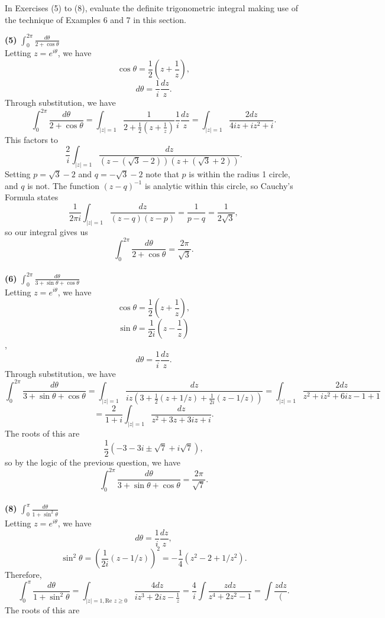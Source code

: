 \documentclass[12pt,letterpaper]{article}
\begin{document}
In Exercises (5) to (8), evaluate the definite trigonometric integral making use of the technique of Examples 6 and 7 in this section.

\textbf{(5)} \(\int_{0}^{2\pi} \frac{d\theta}{2+\cos \theta}\) \\

Letting \(z = e^{i\theta}\), we have \[\cos \theta = \frac{1}{2}\left(z + \frac{1}{z}\right),\] \[d\theta = \frac{1}{i}\frac{dz}{z}.\] Through substitution, we have \[\int_{0}^{2\pi} \frac{d\theta}{2+\cos \theta} = \int_{|z| = 1} \frac{1}{2+\frac{1}{2}\left(z+ \frac{1}{z}\right)}\frac{1}{i}\frac{dz}{z} = \int_{|z|=1} \frac{2dz}{4iz+iz^{2}+i}.\] This factors to \[\frac{2}{i}\int_{|z|=1} \frac{dz}{(z-(\sqrt{3}-2))(z+(\sqrt{3}+2))}.\] Setting \(p = \sqrt{3} - 2\) and \(q = -\sqrt{3}-2\) note that \(p\) is within the radius 1 circle, and \(q\) is not. The function \((z-q)^{-1}\) is analytic within this circle, so Cauchy's Formula states \[\frac{1}{2\pi i} \int_{|z| = 1} \frac{dz}{(z-q)(z-p)} = \frac{1}{p-q} = \frac{1}{2\sqrt{3}},\] so our integral gives us \[\int_{0}^{2\pi} \frac{d\theta}{2+\cos \theta} = \frac{2\pi}{\sqrt{3}}.\] \\

\textbf{(6)} \(\int_{0}^{2\pi} \frac{d\theta}{3+\sin\theta+\cos\theta}\) \\

Letting \(z = e^{i\theta}\), we have \[\cos \theta = \frac{1}{2}\left(z + \frac{1}{z}\right),\] \[\sin \theta = \frac{1}{2i}\left(z-\frac{1}{z}\right)\], \[d\theta = \frac{1}{i}\frac{dz}{z}.\] Through substitution, we have \[\int_{0}^{2\pi} \frac{d\theta}{3+\sin\theta+\cos\theta} = \int_{|z|=1} \frac{dz}{iz\left(3+\frac{1}{2}\left(z+1/z\right) + \frac{1}{2i}\left(z-1/z\right)\right)} = \int_{|z|=1} \frac{2dz}{z^{2}+iz^{2}+6iz-1+1}\]\[=\frac{2}{1+i}\int_{|z|=1} \frac{dz}{z^{2}+3z+3iz+i}.\] The roots of this are \[\frac{1}{2}\left(-3-3i \pm \sqrt{7} + i \sqrt{7}\right),\] so by the logic of the previous question, we have \[\int_{0}^{2\pi} \frac{d\theta}{3+\sin\theta+\cos\theta} = \frac{2\pi}{\sqrt{7}}.\] \\

\textbf{(8)} \(\int_{0}^{\pi} \frac{d\theta}{1+\sin^{2} \theta} \) \\

Letting \(z = e^{i\theta}\), we have \[d\theta = \frac{1}{i}\frac{dz}{z},\] \[\sin^{2}\theta = \left(\frac{1}{2i}\left(z-1/z\right)\right)^{2} = -\frac{1}{4}\left(z^{2}-2+1/z^{2}\right).\] Therefore, \[\int_{0}^{\pi} \frac{d\theta}{1+\sin^{2} \theta} = \int_{|z| = 1, \text{Re } z \geq 0} \frac{4dz}{iz^{3} + 2iz - \frac{1}{z}} = \frac{4}{i} \int \frac{zdz}{z^{4}+2z^{2}-1} = \int \frac{zdz}{(}.\] The roots of this are 
\end{document}
